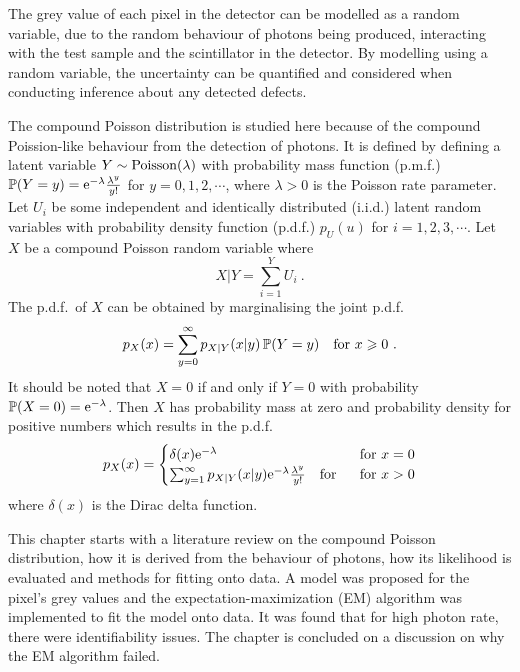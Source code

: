 The grey value of each pixel in the detector can be modelled as a random variable, due to the random behaviour of photons being produced, interacting with the test sample and the scintillator in the detector. By modelling using a random variable, the uncertainty can be quantified and considered when conducting inference about any detected defects.

The compound Poisson distribution is studied here because of the compound Poission-like behaviour from the detection of photons. It is defined by defining a latent variable $Y\sim\operatorname{Poisson}(\lambda)$ with probability mass function (p.m.f.) $\operatorname{\mathbb{P}}(Y=y)=\mathrm{e}^{-\lambda}\frac{\lambda^y}{y!}$ for $y=0,1,2,\cdots$, where $\lambda>0$ is the Poisson rate parameter. Let $U_i$ be some independent and identically distributed (i.i.d.) latent random variables with probability density function (p.d.f.) $p_U(u)$ for $i=1,2,3,\cdots$. Let $X$ be a compound Poisson random variable where
\begin{equation}
  X|Y = \sum_{i=1}^{Y}U_i \ .
  \label{eq:compoundPoisson_X|Y}
\end{equation}
The p.d.f.~of $X$ can be obtained by marginalising the joint p.d.f.
\begin{equation}
  p_X(x)=\sum_{y=0}^\infty p_{X|Y}(x|y)\operatorname{\mathbb{P}}(Y=y) \quad\text{for }x\geqslant 0
  \ .
\end{equation}
It should be noted that $X=0$ if and only if $Y=0$ with probability $\operatorname{\mathbb{P}}(X=0)=\mathrm{e}^{-\lambda}$. Then $X$ has probability mass at zero and probability density for positive numbers which results in the p.d.f.
\begin{equation}
  p_X(x) = 
  \begin{cases}
    \delta(x) \mathrm{e}^{-\lambda}  & \text{ for } x=0 \\ 
    \sum_{y=1}^\infty p_{X|Y}(x|y)\mathrm{e}^{-\lambda}\frac{\lambda^y}{y!} \quad\text{for } & \text{ for } x>0
  \end{cases}
\end{equation}
where $\delta(x)$ is the Dirac delta function.

This chapter starts with a literature review on the compound Poisson distribution, how it is derived from the behaviour of photons, how its likelihood is evaluated and methods for fitting onto data. A model was proposed for the pixel's grey values and the expectation-maximization (EM) algorithm was implemented to fit the model onto data. It was found that for high photon rate, there were identifiability issues. The chapter is concluded on a discussion on why the EM algorithm failed.

